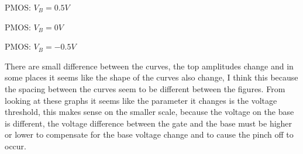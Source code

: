 \documentclass{article}
\begin{document}
\begin{enumerate}
\begin{center}
        PMOS: $V_B = 0.5V$
    \end{center}
    \begin{center}
        
        PMOS: $V_B = 0V$
    \end{center}
    \begin{center}
        
        PMOS: $V_B = -0.5V$
    \end{center}
    \begin{center}
        There are small difference between the curves, the top amplitudes change and in some places it seems like the shape of the curves also change, I think this because the spacing between the curves seem to be different between the figures. From looking at these graphs it seems like the parameter it changes is the voltage threshold, this makes sense on the smaller scale, because the voltage on the base is different, the voltage difference between the gate and the base must be higher or lower to compensate for the base voltage change and to cause the pinch off to occur.
    \end{center}
\end{enumerate}
\end{document}

